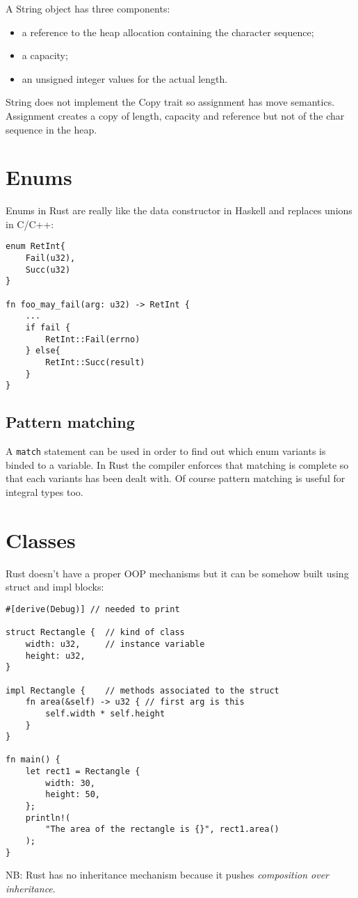 A String object has three components:
\begin{itemize}
    \item a reference to the heap allocation containing the character sequence;
    \item a capacity;
    \item an unsigned integer values for the actual length.
\end{itemize}
String does not implement the Copy trait so assignment has move semantics.
Assignment creates a copy of length, capacity and reference but not of the char sequence in the heap.

\section{Enums}
Enums in Rust are really like the data constructor in Haskell and replaces unions in C/C++:
\begin{verbatim}
enum RetInt{
    Fail(u32),
    Succ(u32)
}

fn foo_may_fail(arg: u32) -> RetInt {
    ...
    if fail {
        RetInt::Fail(errno)
    } else{
        RetInt::Succ(result)
    }
}
\end{verbatim}

\subsection{Pattern matching}
A \verb|match| statement can be used in order to find out which enum variants is binded to a variable.
In Rust the compiler enforces that matching is complete so that each variants has been dealt with.
Of course pattern matching is useful for integral types too.

\section{Classes}
Rust doesn't have a proper OOP mechanisms but it can be somehow built using struct and impl blocks:
\begin{verbatim}
#[derive(Debug)] // needed to print

struct Rectangle {  // kind of class
    width: u32,     // instance variable    
    height: u32,
}

impl Rectangle {    // methods associated to the struct
    fn area(&self) -> u32 { // first arg is this
        self.width * self.height
    }
}

fn main() {
    let rect1 = Rectangle {
        width: 30,
        height: 50,
    };
    println!(
        "The area of the rectangle is {}", rect1.area()
    );
}
\end{verbatim}
NB: Rust has no inheritance mechanism because it pushes \emph{composition over inheritance}.

